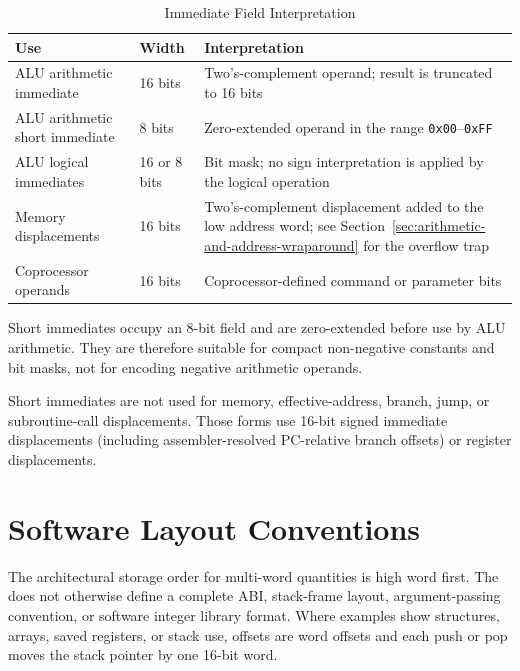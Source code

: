 \begin{table}[H]
	\centering
	\begin{tabularx}{\textwidth}{llX}
		\toprule
		\textbf{Use}                   & \textbf{Width} & \textbf{Interpretation}                                                                                                                    \\
		\midrule
		ALU arithmetic immediate       & 16 bits        & Two's-complement operand; result is truncated to 16 bits                                                                                   \\
		ALU arithmetic short immediate & 8 bits         & Zero-extended operand in the range \texttt{0x00}--\texttt{0xFF}                                                                            \\
		ALU logical immediates         & 16 or 8 bits   & Bit mask; no sign interpretation is applied by the logical operation                                                                       \\
		Memory displacements           & 16 bits        & Two's-complement displacement added to the low address word; see Section~\ref{sec:arithmetic-and-address-wraparound} for the overflow trap \\
		Coprocessor operands           & 16 bits        & Coprocessor-defined command or parameter bits                                                                                              \\
		\bottomrule
	\end{tabularx}
	\caption{Immediate Field Interpretation}
	\label{tab:immediate-interpretation}
\end{table}

Short immediates occupy an 8-bit field and are zero-extended before use by ALU arithmetic. They are therefore suitable
for compact non-negative constants and bit masks, not for encoding negative arithmetic operands.

Short immediates are not used for memory, effective-address, branch, jump, or subroutine-call displacements. Those
forms use 16-bit signed immediate displacements (including assembler-resolved PC-relative branch offsets) or register
displacements.

\section{Software Layout Conventions}

The architectural storage order for multi-word quantities is high word first. The \archmanual{} does not otherwise
define a complete ABI, stack-frame layout, argument-passing convention, or software integer library format. Where
examples show structures, arrays, saved registers, or stack use, offsets are word offsets and each push or pop moves
the stack pointer by one 16-bit word.

